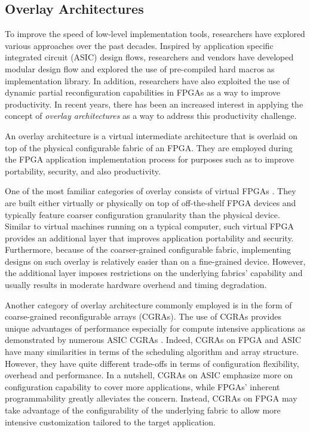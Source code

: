 \subsection{Overlay Architectures}
To improve the speed of low-level implementation tools, researchers have explored various approaches over the past decades.
Inspired by application specific integrated circuit (ASIC) design flows, researchers and vendors have developed modular design flow and explored the use of pre-compiled hard macros \cite{lavin2010using,lavin2011} as implementation library.
In addition, researchers have also exploited the use of dynamic partial reconfiguration capabilities in FPGAs \cite{Frangieh2010} as a way to improve productivity.
In recent years, there has been an increased interest in applying the concept of \emph{overlay architectures} as a way to address this productivity challenge.  


An overlay architecture is a virtual intermediate architecture that is overlaid on top of the physical configurable fabric of an FPGA.  They are employed during the FPGA application implementation process for purposes such as to improve portability, security, and also productivity.

One of the most familiar categories of overlay consists of virtual FPGAs \cite{zuma2013carl,Grant2011Malibu,Coole2010Intermediate,Koch2013CI}. They are built either virtually or physically on top of off-the-shelf FPGA devices and typically feature coarser configuration granularity than the physical device.
Similar to virtual machines running on a typical computer, such virtual FPGA provides an additional layer that improves application portability and security.
Furthermore, because of the coarser-grained configurable fabric, implementing designs on such overlay is relatively easier than on a fine-grained device.
However, the additional layer imposes restrictions on the underlying fabrics' capability and usually results in moderate hardware overhead and timing degradation.

Another category of overlay architecture commonly employed is in the form of coarse-grained reconfigurable arrays (CGRAs).
The use of CGRAs provides unique advantages of performance especially for compute intensive applications as demonstrated by numerous ASIC CGRAs \cite{tessier2001reconfigurable} \cite{compton2002reconfigurable}.
Indeed, CGRAs on FPGA and ASIC have many similarities in terms of the scheduling algorithm and array structure.
However, they have quite different trade-offs in terms of configuration flexibility, overhead and performance.
In a nutshell, CGRAs on ASIC emphasize more on configuration capability to cover more applications, while FPGAs' inherent programmability greatly alleviates the concern.
Instead, CGRAs on FPGA may take advantage of the configurability of the underlying fabric to allow more intensive customization tailored to the target application.

